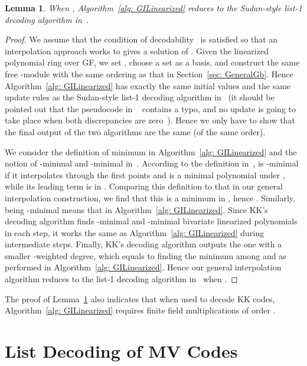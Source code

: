 \documentclass[11pt,onecolumn,draftcls]{IEEEtran}
\newtheorem{lemma}{Lemma}
\begin{document}
\begin{lemma} \label{lemma: KKspecialcase}
When , Algorithm~\ref{alg: GILinearized} reduces to the Sudan-style list-1 decoding algorithm in~\cite{kotter_it08}.
\end{lemma}
\begin{proof}
We assume that the condition of decodability~\cite{kotter_it08} is satisfied so that an interpolation approach works to gives a solution of . Given the linearized polynomial ring  over GF, we set , choose a set  as a basis, and construct the same free -module  with the same ordering as that in Section~\ref{sec: GeneralGb}. Hence Algorithm~\ref{alg: GILinearized} has exactly the same initial values and the same update rules as the Sudan-style list-1 decoding algorithm in~\cite{kotter_it08} (it should be pointed out that the pseudocode in ~\cite{kotter_it08} contains a typo, and no update is going to take place when both discrepancies are zero~\cite{kschischang_privatecomm10}). Hence we only have to show that the final output of the two algorithms are the same (of the same order).

We consider the definition of minimum in Algorithm~\ref{alg: GILinearized} and the notion of -minimal and -minimal in~\cite{kotter_it08}. According to the definition in~\cite{kotter_it08},  is -minimal if it interpolates through the first  points and is a minimal polynomial under , while its leading term is in . Comparing this definition to that in our general interpolation construction, we find that this  is a minimum in , hence . Similarly,  being -minimal means that  in Algorithm~\ref{alg: GILinearized}. Since KK's decoding algorithm finds -minimal and -minimal bivariate linearized polynomials in each step, it works the same as Algorithm~\ref{alg: GILinearized} during intermediate steps. Finally, KK's decoding algorithm outputs the one with a smaller -weighted degree, which equals to finding the minimum among  and  as performed in Algorithm~\ref{alg: GILinearized}. Hence our general interpolation algorithm reduces to the list-1 decoding algorithm in~\cite{kotter_it08} when .
\end{proof}

The proof of Lemma~\ref{lemma: KKspecialcase} also indicates that when used to decode KK codes,  Algorithm~\ref{alg: GILinearized} requires finite field multiplications of order  .

\section{List Decoding of MV Codes} \label{sec: generalMV}
\end{document}
